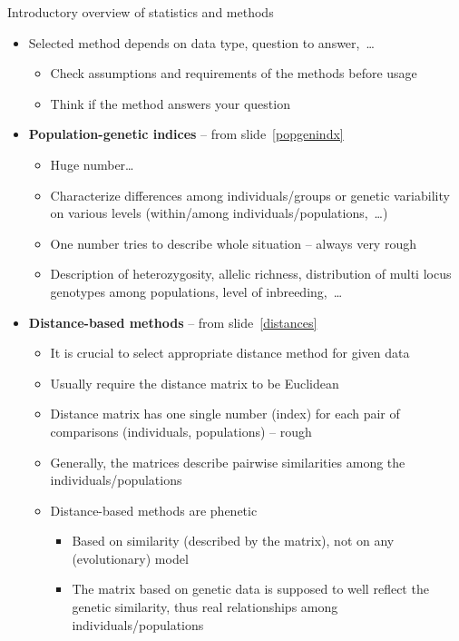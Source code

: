 \documentclass[compress, ucs, xelatex, 11pt, xcolor=svgnames,
  hyperref={
    bookmarks=true,
    unicode=true,
    colorlinks=true,
    pdftitle={Molecular data in R},
    plainpages=false,
    pdfauthor={Vojtech Zeisek},
    pdfsubject={Course about phylogeny and evolution in R},
    pdfcreator={XeLaTeX},
    pdfkeywords={R, evolution, phylogeny, molecular data},
    linkcolor=Tomato,
    anchorcolor=SaddleBrown,
    citecolor=Goldenrod,
    filecolor=DarkMagenta,
    menucolor=Sienna,
    urlcolor=DarkTurquoise,
    pdftex},
  url={hyphens, lowtilde} %
  ]{beamer}
\begin{document}
\begin{frame}[allowframebreaks]{Introductory overview of statistics and methods}
  \begin{itemize}
    \item \alert{Selected method depends on data type, question to answer,~\ldots}
    \begin{itemize}
      \item Check assumptions and requirements of the methods before usage
      \item Think if the method answers your question
    \end{itemize}
    \item \textbf{Population-genetic indices} -- from slide~\ref{popgenindx}
    \begin{itemize}
      \item Huge number\ldots
      \item Characterize differences among individuals/groups or genetic variability on various levels (within/among individuals/populations,~\ldots)
      \item One number tries to describe whole situation -- always very rough
      \item Description of heterozygosity, allelic richness, distribution of multi locus genotypes among populations, level of inbreeding,~\ldots
    \end{itemize}
    \item \textbf{Distance-based methods} -- from slide~\ref{distances}
    \begin{itemize}
      \item \alert{It is crucial to select appropriate distance method for given data}
      \item Usually require the distance matrix to be Euclidean
      \item Distance matrix has one single number (index) for each pair of comparisons (individuals, populations) -- rough
      \item Generally, the matrices describe pairwise similarities among the individuals/populations
      \item Distance-based methods are phenetic
      \begin{itemize}
	\item Based on similarity (described by the matrix), not on any (evolutionary) model
	\item The matrix based on genetic data is supposed to well reflect the genetic similarity, thus real relationships among individuals/populations
      \end{itemize}

\end{itemize}
\end{itemize}
\end{frame}
\end{document}
